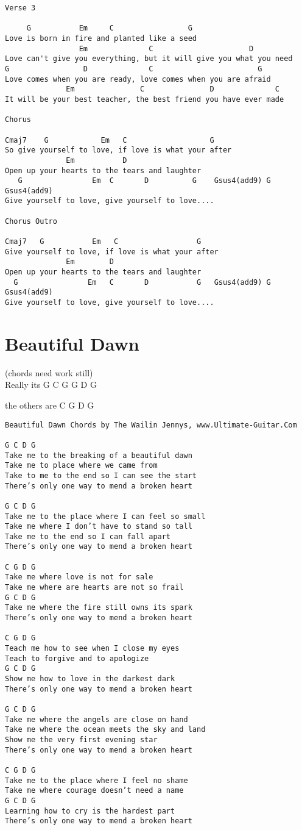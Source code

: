 \documentclass[leqno]{memoir}
\begin{document}
\begin{verbatim}
Verse 3

     G           Em     C                 G
Love is born in fire and planted like a seed
                 Em              C                      D
Love can't give you everything, but it will give you what you need
G                 D              C                        G
Love comes when you are ready, love comes when you are afraid
              Em               C               D              C
It will be your best teacher, the best friend you have ever made

Chorus

Cmaj7    G            Em   C                   G
So give yourself to love, if love is what your after
              Em           D
Open up your hearts to the tears and laughter
   G                Em  C       D          G    Gsus4(add9) G  Gsus4(add9)
Give yourself to love, give yourself to love....

Chorus Outro

Cmaj7   G           Em   C                  G
Give yourself to love, if love is what your after
              Em        D
Open up your hearts to the tears and laughter
  G                Em   C       D           G   Gsus4(add9) G  Gsus4(add9)
Give yourself to love, give yourself to love....

\end{verbatim}
\newpage

\chapter{Beautiful Dawn}
(chords need work still)\\
Really its
G C G
G D G

the others are
C G
D G
\begin{verbatim}
Beautiful Dawn Chords by The Wailin Jennys, www.Ultimate-Guitar.Com

G C D G
Take me to the breaking of a beautiful dawn
Take me to place where we came from
Take to me to the end so I can see the start
There’s only one way to mend a broken heart

G C D G
Take me to the place where I can feel so small
Take me where I don’t have to stand so tall
Take me to the end so I can fall apart
There’s only one way to mend a broken heart

C G D G
Take me where love is not for sale
Take me where are hearts are not so frail
G C D G
Take me where the fire still owns its spark
There’s only one way to mend a broken heart

C G D G
Teach me how to see when I close my eyes
Teach to forgive and to apologize
G C D G
Show me how to love in the darkest dark
There’s only one way to mend a broken heart

G C D G
Take me where the angels are close on hand
Take me where the ocean meets the sky and land
Show me the very first evening star
There’s only one way to mend a broken heart

C G D G
Take me to the place where I feel no shame
Take me where courage doesn’t need a name
G C D G
Learning how to cry is the hardest part
There’s only one way to mend a broken heart
\end{verbatim}
\newpage
\end{document}
